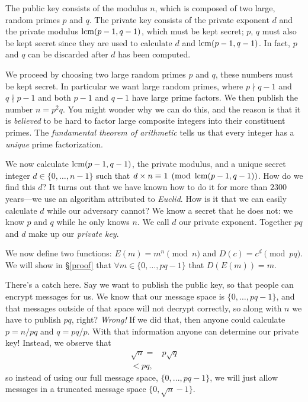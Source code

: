 The public key consists of the modulus $n$, which is composed of two large, random primes $p$ and $q$.
The private key consists of the private exponent $d$ and the private modulus $\operatorname{lcm}(p - 1, q - 1)$,
which must be kept
secret; $p$, $q$ must also be kept secret since they
are used to calculate $d$ and $\operatorname{lcm}(p - 1, q - 1)$.
In fact, $p$ and $q$ can be discarded after $d$
has been computed.

We proceed by choosing two large random primes $p$ and $q$, these
numbers must be kept secret. In particular we want large random primes,
where $p \nmid q - 1$ and $q \nmid p - 1$ and both $p - 1$ and $q - 1$ have
large prime factors. We then publish the number $n = p^2 q$. You
might wonder why we can do this, and the reason is that it is
\emph{believed} to be hard to factor large composite integers into their
constituent primes. The \emph{fundamental theorem of arithmetic} tells
us that every integer has a \emph{unique} prime factorization.

We now calculate $\operatorname{lcm}(p - 1, q - 1)$, the private modulus,
and a unique secret integer $d\in \{0, \ldots, n-1\}$ such
that $d \times n \equiv 1 \pmod{\operatorname{lcm}(p - 1, q - 1)}$. How do we find this $d$?
It turns out that we have known how to do it for more than $2300$
years---we use an algorithm attributed to \emph{Euclid}. How is it that
we can easily calculate $d$ while our adversary cannot? We know a secret
that he does not: we know $p$ and $q$ while he only knows $n$. We call
$d$ our private exponent.
Together $pq$ and $d$ make up our \emph{private key}.

We now define two functions: $E(m) = m^n \pmod{n}$ and $D(c) = c^d
\pmod{pq}$. We will show in \S\ref{proof} that $\forall m \in \{0,
\ldots, pq - 1\}$ that $D(E(m)) = m$.

There's a catch here.
Say we want to publish the public key, so that people can encrypt messages for us.
We know that our message space is $\{0, \ldots, pq - 1\}$,
and that messages outside of that space will not decrypt correctly,
so along with $n$ we have to publish $pq$, right? {\em Wrong!}
If we did that, then anyone could calculate $p = n / pq$ and $q = pq / p$.
With that information anyone can determine our private key!
Instead, we observe that
\begin{align*}
    \sqrt{n} = & p\sqrt{q} \\
             < pq,
\end{align*}
so instead of using our full message space, $\{0, ..., pq - 1\}$,
we will just allow messages in a truncated message space $\{0, \sqrt{n} - 1\}$.

